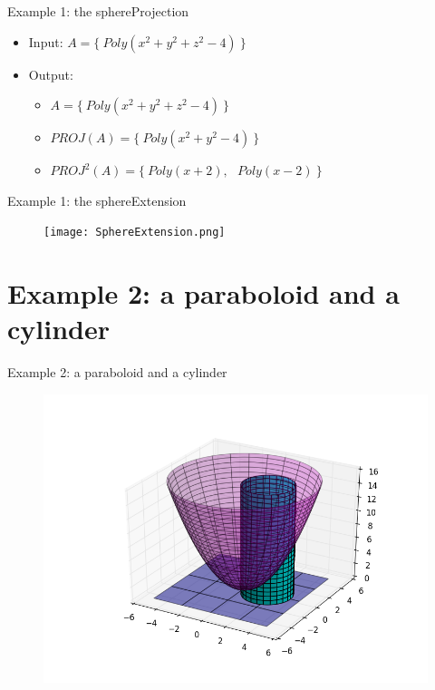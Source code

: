 \documentclass{beamer}
\begin{document}
\begin{frame}{Example 1: the sphere}{Projection}
    \begin{itemize}
   		\item Input: $A = \{\:Poly(x^{2} + y^{2} + z^{2}-4)\:\}$
        \newline
        \item Output:
        \begin{itemize}
        	\item $A = \{\:Poly(x^{2} + y^{2} + z^{2}-4)\:\}$
        	\item $PROJ(A) = \{\:Poly(x^{2} + y^{2} - 4)\:\}$
    		\item $PROJ^{2}(A) = \{\:Poly(x + 2), \: \: \: Poly(x - 2)\:\}$
        \end{itemize}
    \end{itemize}
\end{frame}

\begin{frame}{Example 1: the sphere}{Extension}
\begin{figure}
\texttt{[image: SphereExtension.png]}
\end{figure}
\end{frame}


\section{Example 2: a paraboloid and a cylinder}
\begin{frame}{Example 2: a paraboloid and a cylinder}
\begin{figure}
\includegraphics[width=1\textwidth]{paraboloideconcilindro.png}
\end{figure}
\end{frame}
\end{document}
